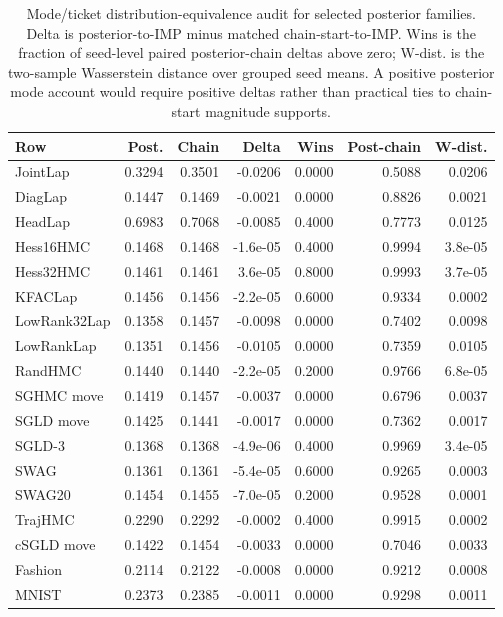 \begin{table}[t]
\centering
\footnotesize
\setlength{\tabcolsep}{3pt}
\begin{tabular}{lrrrrrr}
\toprule
Row & Post. & Chain & Delta & Wins & Post-chain & W-dist. \\
\midrule
JointLap & 0.3294 & 0.3501 & -0.0206 & 0.0000 & 0.5088 & 0.0206 \\
DiagLap & 0.1447 & 0.1469 & -0.0021 & 0.0000 & 0.8826 & 0.0021 \\
HeadLap & 0.6983 & 0.7068 & -0.0085 & 0.4000 & 0.7773 & 0.0125 \\
Hess16HMC & 0.1468 & 0.1468 & -1.6e-05 & 0.4000 & 0.9994 & 3.8e-05 \\
Hess32HMC & 0.1461 & 0.1461 & 3.6e-05 & 0.8000 & 0.9993 & 3.7e-05 \\
KFACLap & 0.1456 & 0.1456 & -2.2e-05 & 0.6000 & 0.9334 & 0.0002 \\
LowRank32Lap & 0.1358 & 0.1457 & -0.0098 & 0.0000 & 0.7402 & 0.0098 \\
LowRankLap & 0.1351 & 0.1456 & -0.0105 & 0.0000 & 0.7359 & 0.0105 \\
RandHMC & 0.1440 & 0.1440 & -2.2e-05 & 0.2000 & 0.9766 & 6.8e-05 \\
SGHMC move & 0.1419 & 0.1457 & -0.0037 & 0.0000 & 0.6796 & 0.0037 \\
SGLD move & 0.1425 & 0.1441 & -0.0017 & 0.0000 & 0.7362 & 0.0017 \\
SGLD-3 & 0.1368 & 0.1368 & -4.9e-06 & 0.4000 & 0.9969 & 3.4e-05 \\
SWAG & 0.1361 & 0.1361 & -5.4e-05 & 0.6000 & 0.9265 & 0.0003 \\
SWAG20 & 0.1454 & 0.1455 & -7.0e-05 & 0.2000 & 0.9528 & 0.0001 \\
TrajHMC & 0.2290 & 0.2292 & -0.0002 & 0.4000 & 0.9915 & 0.0002 \\
cSGLD move & 0.1422 & 0.1454 & -0.0033 & 0.0000 & 0.7046 & 0.0033 \\
Fashion & 0.2114 & 0.2122 & -0.0008 & 0.0000 & 0.9212 & 0.0008 \\
MNIST & 0.2373 & 0.2385 & -0.0011 & 0.0000 & 0.9298 & 0.0011 \\
\bottomrule
\end{tabular}
\caption{Mode/ticket distribution-equivalence audit for selected
posterior families. Delta is posterior-to-IMP minus matched
chain-start-to-IMP. Wins is the fraction of seed-level paired
posterior-chain deltas above zero; W-dist. is the two-sample
Wasserstein distance over grouped seed means. A positive posterior
mode account would require positive deltas rather than practical
ties to chain-start magnitude supports.}
\label{tab:mode-ticket-equivalence-audit}
\end{table}

